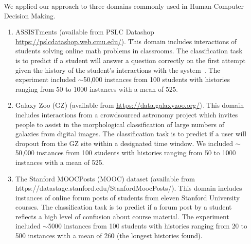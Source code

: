 \documentclass[letterpaper]{article} %
\theoremstyle{definition}
\newcommand{\kibitz}[2]{\ifnum\Comments=1{\color{#1}{#2}}\fi}
\newcommand{\ym}[1]{\kibitz{blue}{[YM:#1]}}
\newcommand{\li}[1]{\kibitz{brown}{[LL:#1]}}
\begin{document}
We applied our approach to three domains  commonly  used  in
Human-Computer Decision Making. \li{Why capitalize Human-Computer Decision-Making?}

\begin{enumerate}
    \item   ASSISTments (available from PSLC Datashop \url{https://pslcdatashop.web.cmu.edu/}). This domain
    includes interactions of students  solving online math problems in classrooms. The classification task is to predict if a student will answer a question  correctly on the first attempt given the history of the student's interactions with the system~\cite{feng2006addressing}.
    The experiment included $\sim$50,000 instances from 100 students with histories ranging from 50 to 1000 instances with a mean of 525.

    \item   Galaxy Zoo  (GZ)    (available from \url{https://data.galaxyzoo.org/}). This domain includes interactions from a crowdsourced astronomy project which invites people to assist in the morphological classification of large numbers of galaxies from digital images.  The classification task is to predict if a user
    will dropout from the GZ site within a designated time window. We included $\sim$50,000 instances from 100 students with histories ranging from 50 to 1000 instances with a mean of 525.


    \item The Stanford MOOCPosts (MOOC) dataset (available from https://datastage.stanford.edu/StanfordMoocPosts/). This domain  includes instances of   online forum posts of students from eleven Stanford University   courses. The  classification task is to predict if a forum post by a student reflects a high level of confusion about course material. The experiment included $\sim$5000 instances from 100 students with histories ranging from 20 to 500 instances with a mean of 260 (the longest histories found).

\end{enumerate}
\end{document}

